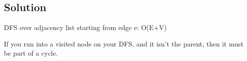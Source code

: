 \subsection*{Solution}

DFS over adjacency list starting from edge e: O(E+V) 

If you run into a visited node on your DFS, and it isn't the parent, then it must be part of a cycle.

